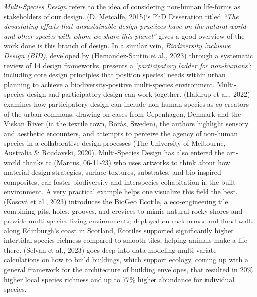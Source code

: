 \documentclass[
  12pt,
  letterpaper,
  DIV=11,
  numbers=noendperiod]{scrartcl}
\begin{document}
\emph{Multi-Species Design} refers to the idea of considering non-human
life-forms as stakeholders of our design. (D. Metcalfe, 2015)`s PhD
Disseration titled \emph{``The devastating effects that unsustainable
design practices have on the natural world and other species with whom
we share this planet''} gives a good overview of the work done is this
branch of design. In a similar vein, \emph{Biodiversity Inclusive Design
(BID)}, developed by (Hernandez-Santin et al., 2023) through a
systematic review of 14 design frameworks, presents a
\emph{'participatory ladder for non-humans'}; including core design
principles that position species' needs within urban planning to achieve
a biodiversity-positive multi-species environment. Multi-species design
and participatory design can work together. (Haldrup et al., 2022)
examines how participatory design can include non-human species as
co-creators of the urban commons; drawing on cases from Copenhagen,
Denmark and the Viskan River (in the textile town, Borås, Sweden), the
authors highlight sensory and aesthetic encounters, and attempts to
perceive the agency of non-human species in a collaborative design
processes (The University of Melbourne, Australia \& Roudavski, 2020).
Multi-Species Design has also entered the art-world thanks to (Marcus,
06-11-23) who uses artworks to think about how material design
strategies, surface textures, substrates, and bio-inspired composites,
can foster biodiversity and interspecies cohabitation in the built
environment. A very practical example helps one visualize this field the
best. (Kosová et al., 2023) introduces the BioGeo Ecotile, a
eco-engineering tile combining pits, holes, grooves, and crevices to
mimic natural rocky shores and provide multi-species
living-environments; deployed on rock armor and flood walls along
Edinburgh's coast in Scotland, Ecotiles supported significantly higher
intertidal species richness compared to smooth tiles, helping animals
make a life there. (Selvan et al., 2023) goes deep into data modeling
multi-variate calculations on how to build buildings, which support
ecology, coming up with a general framework for the architecture of
building envelopes, that resulted in 20\% higher local species richness
and up to 77\% higher abundance for individual species.
\end{document}

